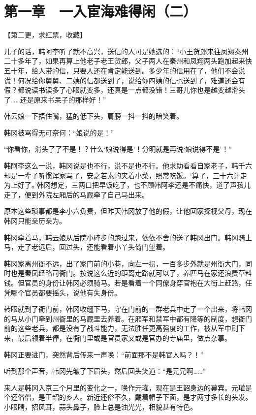 \section{第一章　一入宦海难得闲（二）}

【第二更，求红票，收藏】

儿子的话，韩阿李听了就不高兴，送信的人可是她选的：“小王货郎来往凤翔秦州二十多年了，如果再算上他老子老王货郎，父子两人在秦州和凤翔两头跑加起来快五十年，给人带的信，只要人还在肯定能送到。多少年的信用在了，他们不会说谎！何况给你舅舅、二姨的信都送到了，说给你四姨的信也送到了，难道还会有假？都说读书读多了心眼就变多，还真是一点都没错！三哥儿你也是越变越滑头了……还是原来书呆子的那样好！”

韩云娘一下捂住嘴，猛的低下头，肩膀一抖一抖的暗笑着。

韩冈被骂得无可奈何：“娘说的是！”

“你看你，滑头了了不是！？什么‘娘说得是’！分明就是再说‘娘说得不是’！”

韩阿李这么一说，韩冈说是也不行，说不是也不行。他求助看看自家老子，韩千六却是一辈子听惯浑家骂了，安之若素的夹着小菜，照常吃饭。‘算了，三十六计走为上好了。’韩冈想定，三两口把早饭吃了，也不顾韩阿李还是不痛快，道了声孩儿走了，便到外院左厢后的马厩牵了自己马出来。

原本这些琐事都是李小六负责，但昨天韩冈放了他的假，让他回家探视父母，现在韩冈只能亲历亲为。

韩冈牵着马，韩云娘从后院小碎步的跑过来，依依不舍的送了韩冈出门。韩冈骑上马，走了老远后，回过头，还能看着小丫头倚门望着。

韩冈家离州衙不远，出了家门前的小巷，向左一拐，一百多步外就是州衙大门，同时也是秦凤经略司衙门。按说这么近的距离走路就可以了，养匹马在家还浪费草料钱。但官员的身份让韩冈必须骑马。若是看着一个同僚身穿官袍在大街上赶路，任凭哪个官员都要摇头，说他有失身份。

转眼就到了衙门前，韩冈收缰下马，守在门前的一群老兵中走了一个出来，将韩冈的马从小门牵到州衙里的马厩里去养着。在厢军和禁军中都有降等的制度，想衙门前的这些老兵，都是没有了战斗能力，无法胜任更高强度的工作，被从军中刷下来，最后领着半俸，在衙门里或是官员家又或是官办的寺庙里，做点杂事。

韩冈正要进门，突然背后传来一声唤：“前面那不是韩官人吗？！”

听到那个声音，韩冈先皱了下眉头，然后回头笑道：“是元兄啊……”

来人是韩冈入京三个月里的变化之一，唤作元瓘，现在是王韶身边的幕宾。元瓘是个还俗僧，是王韶的乡人。新近还俗不久，戴着帽子下面，是才两寸多长的头发。小眼睛，招风耳，蒜头鼻子，脸上总是油光光，相貌甚有特色。

